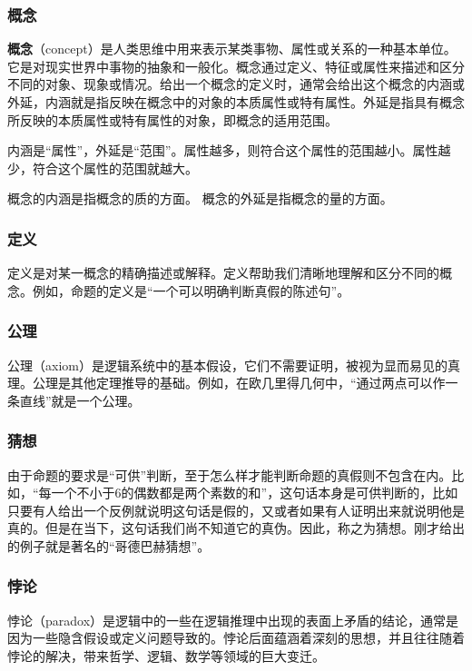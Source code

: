 \subsubsection{概念}

\textbf{概念}（concept）是人类思维中用来表示某类事物、属性或关系的一种基本单位。它是对现实世界中事物的抽象和一般化。概念通过定义、特征或属性来描述和区分不同的对象、现象或情况。给出一个概念的定义时，通常会给出这个概念的内涵或外延，内涵就是指反映在概念中的对象的本质属性或特有属性。外延是指具有概念所反映的本质属性或特有属性的对象，即概念的适用范围。

内涵是“属性”，外延是“范围”。属性越多，则符合这个属性的范围越小。属性越少，符合这个属性的范围就越大。

概念的内涵是指概念的质的方面。
概念的外延是指概念的量的方面。

\subsubsection{定义}

定义是对某一概念的精确描述或解释。定义帮助我们清晰地理解和区分不同的概念。例如，命题的定义是“一个可以明确判断真假的陈述句”。

\subsubsection{公理}

公理（axiom）是逻辑系统中的基本假设，它们不需要证明，被视为显而易见的真理。公理是其他定理推导的基础。例如，在欧几里得几何中，“通过两点可以作一条直线”就是一个公理。

\subsubsection{猜想}

由于命题的要求是“可供”判断，至于怎么样才能判断命题的真假则不包含在内。比如，“每一个不小于6的偶数都是两个素数的和”，这句话本身是可供判断的，比如只要有人给出一个反例就说明这句话是假的，又或者如果有人证明出来就说明他是真的。但是在当下，这句话我们尚不知道它的真伪。因此，称之为猜想。刚才给出的例子就是著名的“哥德巴赫猜想”。

\subsubsection{悖论}

悖论（paradox）是逻辑中的一些在逻辑推理中出现的表面上矛盾的结论，通常是因为一些隐含假设或定义问题导致的。悖论后面蕴涵着深刻的思想，并且往往随着悖论的解决，带来哲学、逻辑、数学等领域的巨大变迁。

